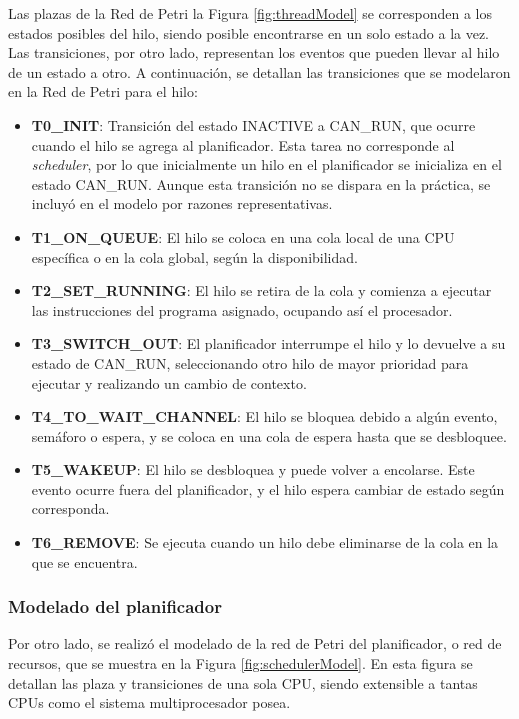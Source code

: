 Las plazas de la Red de Petri la Figura \ref{fig:threadModel} se corresponden a los estados posibles del hilo, siendo posible encontrarse en un solo estado a la vez. Las transiciones, por otro lado, representan los eventos que pueden llevar al hilo de un estado a otro. A continuación, se detallan las transiciones que se modelaron en la Red de Petri para el hilo:

\begin{itemize}
    \item \textbf{T0\_INIT}: Transición del estado INACTIVE a CAN\_RUN, que ocurre cuando el hilo se agrega al planificador. Esta tarea no corresponde al \textit{scheduler}, por lo que inicialmente un hilo en el planificador se inicializa en el estado CAN\_RUN. Aunque esta transición no se dispara en la práctica, se incluyó en el modelo por razones representativas.
    \item \textbf{T1\_ON\_QUEUE}: El hilo se coloca en una cola local de una CPU específica o en la cola global, según la disponibilidad.
    \item \textbf{T2\_SET\_RUNNING}: El hilo se retira de la cola y comienza a ejecutar las instrucciones del programa asignado, ocupando así el procesador.
    \item \textbf{T3\_SWITCH\_OUT}: El planificador interrumpe el hilo y lo devuelve a su estado de CAN\_RUN, seleccionando otro hilo de mayor prioridad para ejecutar y realizando un cambio de contexto.
    \item \textbf{T4\_TO\_WAIT\_CHANNEL}: El hilo se bloquea debido a algún evento, semáforo o espera, y se coloca en una cola de espera hasta que se desbloquee.
    \item \textbf{T5\_WAKEUP}: El hilo se desbloquea y puede volver a encolarse. Este evento ocurre fuera del planificador, y el hilo espera cambiar de estado según corresponda.
    \item \textbf{T6\_REMOVE}: Se ejecuta cuando un hilo debe eliminarse de la cola en la que se encuentra.
\end{itemize}


\subsubsection{Modelado del planificador}

Por otro lado, se realizó el modelado de la red de Petri del planificador, o red de recursos, que se muestra en la Figura \ref{fig:schedulerModel}. En esta figura se detallan las plaza y transiciones de una sola CPU, siendo extensible a tantas CPUs como el sistema multiprocesador posea.

